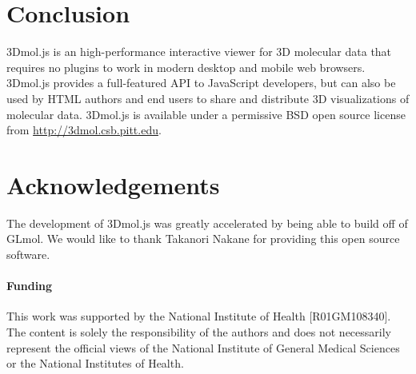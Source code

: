 \documentclass[]{bioinfo}
\begin{document}
\section{Conclusion}
3Dmol.js is an high-performance interactive viewer for 3D molecular data that requires no plugins to work in modern desktop and mobile web browsers.
3Dmol.js provides a full-featured API to JavaScript developers, but can also be used by HTML authors and end users to share and distribute
3D visualizations of molecular data. 3Dmol.js is available under a permissive BSD open source license from \url{http://3dmol.csb.pitt.edu}.
 
\section*{Acknowledgements}
The development of 3Dmol.js was greatly accelerated by being able to build off of GLmol.  We
would like to thank Takanori Nakane for providing this open source software.

\paragraph{Funding\textcolon} 
This work was supported by the National Institute of Health [R01GM108340].
The content is solely the responsibility of the authors and does not necessarily
represent the official views of the National Institute of General Medical Sciences
or the National Institutes of Health.



\end{document}
